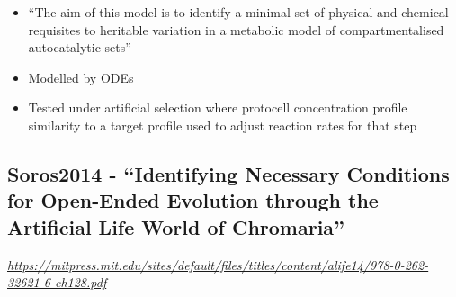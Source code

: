 		\begin{itemize}
			\item
			
			``The aim of this model is to identify a minimal set of physical and
			chemical requisites to heritable variation in a metabolic model of
			compartmentalised autocatalytic sets''
			
			\item
			
			Modelled by ODEs
			
			\item
			
			Tested under artificial selection where protocell concentration
			profile similarity to a target profile used to adjust reaction rates
			for that step
			
		\end{itemize}
		
		\hypertarget{soros2014---identifying-necessary-conditions-for-open-ended-evolution-through-the-artificial-life-world-of-chromaria}{\subsection{Soros2014
				- ``Identifying Necessary Conditions for Open-Ended Evolution through
				the Artificial Life World of
				Chromaria''}\label{soros2014---identifying-necessary-conditions-for-open-ended-evolution-through-the-artificial-life-world-of-chromaria}}
		
		\href{https://mitpress.mit.edu/sites/default/files/titles/content/alife14/978-0-262-32621-6-ch128.pdf}{\emph{https://mitpress.mit.edu/sites/default/files/titles/content/alife14/978-0-262-32621-6-ch128.pdf}}
		
